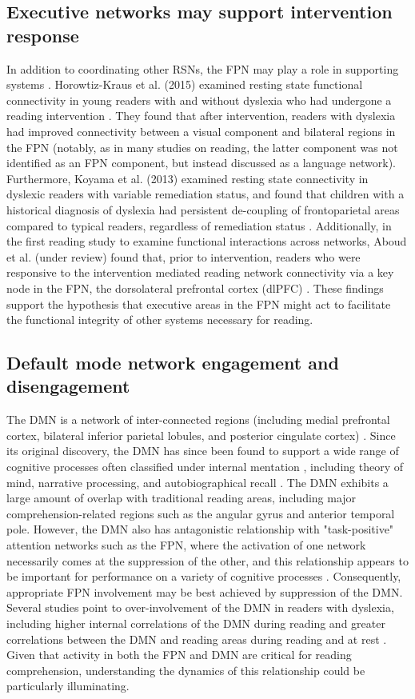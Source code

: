 \subsection{Executive networks may support intervention response}
In addition to coordinating other RSNs, the FPN may play a role in supporting systems \cite{Cole2015}. Horowtiz-Kraus et al. (2015) examined resting state functional connectivity in young readers with and without dyslexia who had undergone a reading intervention \cite{HorowitzKraus2015}. They found that after intervention, readers with dyslexia had improved connectivity between a visual component and bilateral regions in the FPN (notably, as in many studies on reading, the latter component was not identified as an FPN component, but instead discussed as a language network). Furthermore, Koyama et al. (2013) examined resting state connectivity in dyslexic readers with variable remediation status, and found that children with a historical diagnosis of dyslexia had persistent de-coupling of frontoparietal areas compared to typical readers, regardless of remediation status \cite{Koyama2013}. Additionally, in the first reading study to examine functional interactions across networks, Aboud et al. (under review) found that, prior to intervention, readers who were responsive to the intervention mediated reading network connectivity via a key node in the FPN, the dorsolateral prefrontal cortex (dlPFC) \cite{Aboud2017_NF}. These findings support the hypothesis that executive areas in the FPN might act to facilitate the functional integrity of other systems necessary for reading.

\subsection{Default mode network engagement and disengagement} 
The DMN is a network of inter-connected regions (including medial prefrontal cortex, bilateral inferior parietal lobules, and posterior cingulate cortex) \cite{Shulman1997}. Since its original discovery, the DMN has since been found to support a wide range of cognitive processes often classified under internal mentation \cite{Buckner2008}, including theory of mind, narrative processing, and autobiographical recall \cite{AbdulSabur2014}. The DMN exhibits a large amount of overlap with traditional reading areas, including major comprehension-related regions such as the angular gyrus and anterior temporal pole. However, the DMN also has antagonistic relationship with "task-positive" attention networks such as the FPN, where the activation of one network necessarily comes at the suppression of the other, and this relationship appears to be important for performance on a variety of cognitive processes \cite{Fox2005, Keller2015}. Consequently, appropriate FPN involvement may be best achieved by suppression of the DMN. Several studies point to over-involvement of the DMN in readers with dyslexia, including higher internal correlations of the DMN during reading \cite{Finn2013} and greater correlations between the DMN and reading areas during reading and at rest \cite{Schurz2015}. Given that activity in both the FPN and DMN are critical for reading comprehension, understanding the dynamics of this relationship could be particularly illuminating.

